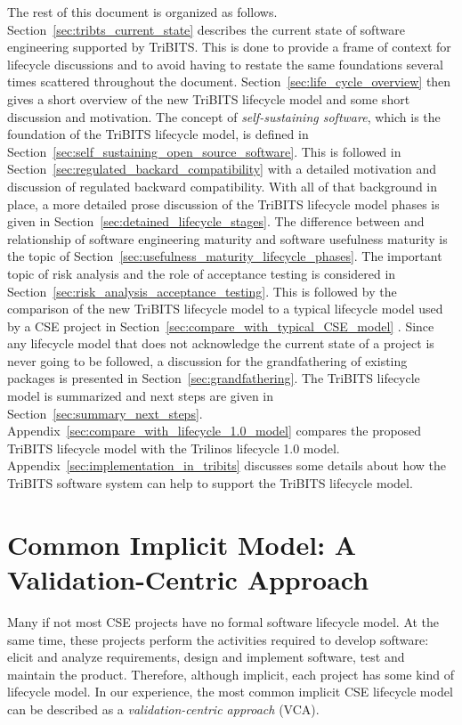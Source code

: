 \documentclass[11pt]{SANDreport}
\begin{document}
The rest of this document is organized as follows.
Section~\ref{sec:tribts_current_state} describes the current state of
software engineering supported by TriBITS.  This is done to provide a
frame of context for lifecycle discussions and to avoid having to
restate the same foundations several times scattered throughout the
document.  Section~\ref{sec:life_cycle_overview} then gives a short
overview of the new TriBITS lifecycle model and some short discussion
and motivation.  The concept of \textit{self-sustaining software},
which is the foundation of the TriBITS lifecycle model, is defined in
Section~\ref{sec:self_sustaining_open_source_software}.  This is
followed in Section~\ref{sec:regulated_backard_compatibility} with a
detailed motivation and discussion of regulated backward
compatibility.  With all of that background in place, a more detailed
prose discussion of the TriBITS lifecycle model phases is given in
Section~\ref{sec:detained_lifecycle_stages}.  The difference between
and relationship of software engineering maturity and software
usefulness maturity is the topic of
Section~\ref{sec:usefulness_maturity_lifecycle_phases}.  The important
topic of risk analysis and the role of acceptance testing is
considered in Section~\ref{sec:risk_analysis_acceptance_testing}.
This is followed by the comparison of the new TriBITS lifecycle model
to a typical lifecycle model used by a CSE project in
Section~\ref{sec:compare_with_typical_CSE_model} .  Since any
lifecycle model that does not acknowledge the current state of a
project is never going to be followed, a discussion for the
grandfathering of existing packages is presented in
Section~\ref{sec:grandfathering}.  The TriBITS lifecycle model is
summarized and next steps are given in
Section~\ref{sec:summary_next_steps}.
Appendix~\ref{sec:compare_with_lifecycle_1.0_model} compares the
proposed TriBITS lifecycle model with the Trilinos lifecycle 1.0
model.  Appendix~\ref{sec:implementation_in_tribits} discusses some
details about how the TriBITS software system can help to support the
TriBITS lifecycle model.

%
{}\section {Common Implicit Model: A Validation-Centric Approach}
\label{sec:validation_centric_approach}

Many if not most CSE projects have no formal software lifecycle model.
At the same time, these projects perform the activities required to
develop software: elicit and analyze requirements, design and
implement software, test and maintain the product.  Therefore,
although implicit, each project has some kind of lifecycle model.  In
our experience, the most common implicit CSE lifecycle model can be
described as a \textit{validation-centric approach} (VCA).
\end{document}
